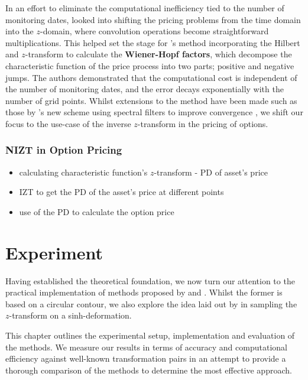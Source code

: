 \documentclass[a4paper]{report}
\begin{document}
In an effort to eliminate the computational inefficiency tied to the number of monitoring dates, \citet{fusai2006exact} looked into shifting the pricing problems from the time domain into the $z$-domain, where convolution operations become straightforward multiplications. This helped set the stage for \citet{fusai2016spitzer}'s method incorporating the Hilbert and $z$-transform to calculate the \textbf{Wiener-Hopf factors}, which decompose the characteristic function of the price process into two parts; positive and negative jumps. The authors demonstrated that the computational cost is independent of the number of monitoring dates, and the error decays exponentially with the number of grid points. Whilst extensions to the method have been made such as those by \citet{phelan2018fourier}'s new scheme using spectral filters to improve convergence \citep{phelan2019hilbert}, we shift our focus to the use-case of the inverse $z$-transform in the pricing of options.

\subsection{NIZT in Option Pricing}
\begin{itemize}
    \item calculating characteristic function's $z$-transform - PD of asset's price
    \item IZT to get the PD of the asset's price at different points
    \item use of the PD to calculate the option price
\end{itemize}

\chapter{Experiment}
Having established the theoretical foundation, we now turn our attention to the practical implementation of methods proposed by \citet{AbateWhitt1992a, AbateWhitt1992b} and \citet{Cavers1978FFT}. Whilst the former is based on a circular contour, we also explore the idea laid out by \citet{levendorskii2022sinh} in sampling the $z$-transform on a sinh-deformation.

This chapter outlines the experimental setup, implementation and evaluation of the methods. We measure our results in terms of accuracy and computational efficiency against well-known transformation pairs in an attempt to provide a thorough comparison of the methods to determine the most effective approach.
\end{document}
